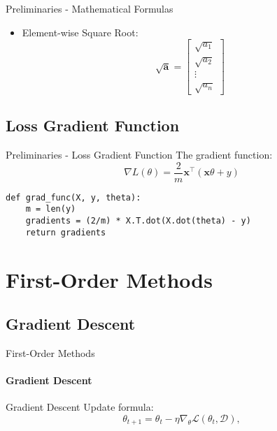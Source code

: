 \documentclass{beamer}
\begin{document}
\begin{frame}{Preliminaries - Mathematical Formulas}
\begin{itemize}
    \item Element-wise Square Root: 
    \[
        \sqrt{\mathbf{a}} =
        \begin{bmatrix}
            \sqrt{a_1} \\
            \sqrt{a_2} \\
            \vdots \\
            \sqrt{a_n}
        \end{bmatrix}
    \]
    
    \end{itemize}

    

\end{frame}
\subsection{Loss Gradient Function}
\begin{frame}{Preliminaries - Loss Gradient Function}
    The gradient function:
    \[
        \nabla L(\theta) = \frac{2}{m} \mathbf x^{\top}(\mathbf x \theta + y)
    \]

    \begin{verbatim}
def grad_func(X, y, theta):
    m = len(y)
    gradients = (2/m) * X.T.dot(X.dot(theta) - y)
    return gradients
    \end{verbatim}
\end{frame}

\section{First-Order Methods} 

\subsection{Gradient Descent}

\begin{frame}{First-Order Methods}
\framesubtitle{Gradient Descent}
\begin{block}{Gradient Descent}
Update formula:
\[
\theta_{t+1} = \theta_t - \eta \nabla_\theta \mathcal L(\theta_t, \mathcal D),
\]
\end{block}
\end{frame}
\end{document}
